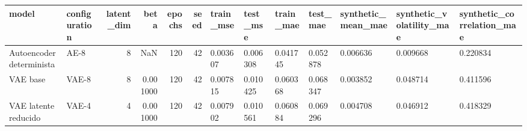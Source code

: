 \begin{tabular}{llrrrrlllllll}
\toprule
model & configuration & latent\_dim & beta & epochs & seed & train\_mse & test\_mse & train\_mae & test\_mae & synthetic\_mean\_mae & synthetic\_volatility\_mae & synthetic\_correlation\_mae \\
\midrule
Autoencoder determinista & AE-8 & 8 & NaN & 120 & 42 & 0.003607 & 0.006308 & 0.041745 & 0.052878 & 0.006636 & 0.009668 & 0.220834 \\
VAE base & VAE-8 & 8 & 0.001000 & 120 & 42 & 0.007815 & 0.010425 & 0.060368 & 0.068347 & 0.003852 & 0.048714 & 0.411596 \\
VAE latente reducido & VAE-4 & 4 & 0.001000 & 120 & 42 & 0.007902 & 0.010561 & 0.060884 & 0.069296 & 0.004708 & 0.046912 & 0.418329 \\
\bottomrule
\end{tabular}

